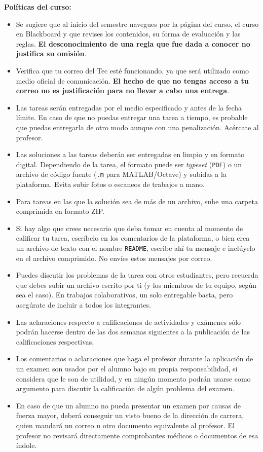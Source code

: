 \documentclass[12pt, letterpaper, oneside]{article}
\begin{document}
  \noindent\textbf{Políticas del curso:}  
  \begin{itemize}
  \item Se sugiere que al inicio del semestre navegues por la página del curso, el curso en Blackboard y que revises los contenidos, su forma de evaluación y las reglas. \textbf{El desconocimiento de una regla que fue dada a conocer no justifica su omisión}.
  \item Verifica que tu correo del Tec esté funcionando, ya que será utilizado como medio oficial de comunicación. \textbf{El hecho de que no tengas acceso a tu correo no es justificación para no llevar a cabo una entrega}.
  \item Las tareas serán entregadas por el medio especificado y antes de la fecha límite. En caso de que no puedas entregar una tarea a tiempo, es probable que puedas entregarla de otro modo aunque con una penalización. Acércate al profesor.
  \item Las soluciones a las tareas deberán ser entregadas en limpio y en formato digital. Dependiendo de la tarea, el formato puede ser \textit{typeset} (\texttt{PDF}) o un archivo de código fuente (\texttt{.m} para MATLAB/Octave) y subidas a la plataforma. Evita subir fotos o escaneos de trabajos a mano.
  \item Para tareas en las que la solución sea de más de un archivo, sube una carpeta comprimida en formato ZIP. 
  \item Si hay algo que crees necesario que deba tomar en cuenta al momento de calificar tu tarea, escríbelo en los comentarios de la plataforma, o bien crea un archivo de texto con el nombre \texttt{README}, escribe ahí tu mensaje e inclúyelo en el archivo comprimido. No envíes estos mensajes por correo.
  \item Puedes discutir los problemas de la tarea con otros estudiantes, pero recuerda que debes subir un archivo escrito por ti (y los miembros de tu equipo, según sea el caso). En trabajos colaborativos, un solo entregable basta, pero asegúrate de incluir a todos los integrantes.
  \item Las aclaraciones respecto a calificaciones de actividades y exámenes sólo podrán hacerse dentro de las dos semanas siguientes a la publicación de las calificaciones respectivas.
  \item Los comentarios o aclaraciones que haga el profesor durante la aplicación de un examen son usados por el alumno bajo su propia responsabilidad, si considera que le son de utilidad, y en ningún momento podrán usarse como argumento para discutir la calificación de algún problema del examen.
  \item En caso de que un alumno no pueda presentar un examen por causas de fuerza mayor, deberá conseguir un visto bueno de la dirección de carrera, quien mandará un correo u otro documento equivalente al profesor. El profesor no revisará directamente comprobantes médicos o documentos de esa índole.
  \end{itemize}
\end{document}
